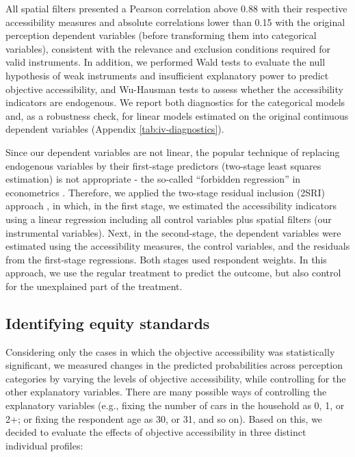 \documentclass[preprint, 3p,
authoryear]{elsarticle} %
\begin{document}
All spatial filters presented a Pearson correlation above 0.88 with
their respective accessibility measures and absolute correlations lower
than 0.15 with the original perception dependent variables (before
transforming them into categorical variables), consistent with the
relevance and exclusion conditions required for valid instruments. In
addition, we performed Wald tests to evaluate the null hypothesis of
weak instruments and insufficient explanatory power to predict objective
accessibility, and Wu-Hausman tests to assess whether the accessibility
indicators are endogenous. We report both diagnostics for the
categorical models and, as a robustness check, for linear models
estimated on the original continuous dependent variables (Appendix
\ref{tab:iv-diagnostics}).

Since our dependent variables are not linear, the popular technique of
replacing endogenous variables by their first-stage predictors
(two-stage least squares estimation) is not appropriate - the so-called
``forbidden regression'' in econometrics
\citep{wooldridge2010, cunningham2021causal, huntington-klein2021}.
Therefore, we applied the two-stage residual inclusion (2SRI) approach
\citep{terza2008}, in which, in the first stage, we estimated the
accessibility indicators using a linear regression including all control
variables plus spatial filters (our instrumental variables). Next, in
the second-stage, the dependent variables were estimated using the
accessibility measures, the control variables, and the residuals from
the first-stage regressions. Both stages used respondent weights. In
this approach, we use the regular treatment to predict the outcome, but
also control for the unexplained part of the treatment.

\subsection{Identifying equity
standards}\label{identifying-equity-standards}

Considering only the cases in which the objective accessibility was
statistically significant, we measured changes in the predicted
probabilities across perception categories by varying the levels of
objective accessibility, while controlling for the other explanatory
variables. There are many possible ways of controlling the explanatory
variables (e.g., fixing the number of cars in the household as 0, 1, or
2+; or fixing the respondent age as 30, or 31, and so on). Based on
this, we decided to evaluate the effects of objective accessibility in
three distinct individual profiles:
\end{document}
